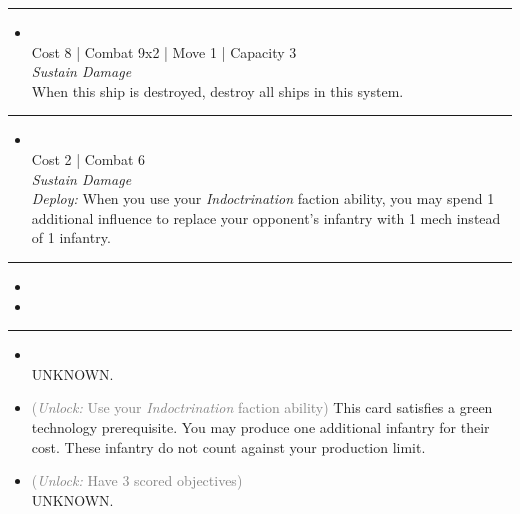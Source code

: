 \begin{multicols}{2}
\vspace{-10pt}\rule{\hsize}{0.4pt}\vspace{5pt}


\begin{itemize}
\item {}\\
Cost 8 | Combat 9x2 | Move 1 | Capacity 3 \\
\emph{Sustain Damage}\\
When this ship is destroyed, destroy all ships in this system.
\end{itemize}

\vspace{-10pt}\rule{\hsize}{0.4pt}\vspace{5pt}


\begin{itemize}
\item {}\\
Cost 2 | Combat 6 \\
\emph{Sustain Damage}\\
\emph{Deploy:} When you use your \emph{Indoctrination} faction ability, you may spend 1 additional influence to replace your opponent's infantry with 1 mech instead of 1 infantry. 
\end{itemize}

\vspace{-10pt}\rule{\hsize}{0.4pt}\vspace{5pt}

\nounits

\columnbreak
{}

\begin{itemize}
\item \spinner
\item \impulseCore
\end{itemize}

\vspace{-10pt}\rule{\hsize}{0.4pt}\vspace{5pt}


\begin{itemize}
\item {}\\
UNKNOWN.
\item {} \textcolor{gray}{(\emph{Unlock:} Use your \emph{Indoctrination} faction ability)}
This card satisfies a green technology prerequisite. You may produce one additional infantry for their cost. These infantry do not count against your production limit.
\item {} \textcolor{gray}{(\emph{Unlock:} Have 3 scored objectives)}\\
UNKNOWN.
\end{itemize}


\end{multicols}
